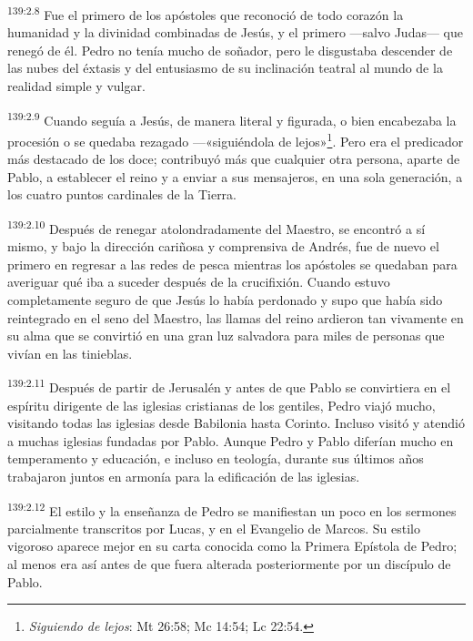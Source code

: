\par 
\textsuperscript{139:2.8} Fue el primero de los apóstoles que reconoció de todo corazón la humanidad y la divinidad combinadas de Jesús, y el primero ---salvo Judas--- que renegó de él. Pedro no tenía mucho de soñador, pero le disgustaba descender de las nubes del éxtasis y del entusiasmo de su inclinación teatral al mundo de la realidad simple y vulgar.

\par 
\textsuperscript{139:2.9} Cuando seguía a Jesús, de manera literal y figurada, o bien encabezaba la procesión o se quedaba rezagado ---«siguiéndola de lejos»\footnote{\textit{Siguiendo de lejos}: Mt 26:58; Mc 14:54; Lc 22:54.}. Pero era el predicador más destacado de los doce; contribuyó más que cualquier otra persona, aparte de Pablo, a establecer el reino y a enviar a sus mensajeros, en una sola generación, a los cuatro puntos cardinales de la Tierra.

\par 
\textsuperscript{139:2.10} Después de renegar atolondradamente del Maestro, se encontró a sí mismo, y bajo la dirección cariñosa y comprensiva de Andrés, fue de nuevo el primero en regresar a las redes de pesca mientras los apóstoles se quedaban para averiguar qué iba a suceder después de la crucifixión. Cuando estuvo completamente seguro de que Jesús lo había perdonado y supo que había sido reintegrado en el seno del Maestro, las llamas del reino ardieron tan vivamente en su alma que se convirtió en una gran luz salvadora para miles de personas que vivían en las tinieblas.

\par 
\textsuperscript{139:2.11} Después de partir de Jerusalén y antes de que Pablo se convirtiera en el espíritu dirigente de las iglesias cristianas de los gentiles, Pedro viajó mucho, visitando todas las iglesias desde Babilonia hasta Corinto. Incluso visitó y atendió a muchas iglesias fundadas por Pablo. Aunque Pedro y Pablo diferían mucho en temperamento y educación, e incluso en teología, durante sus últimos años trabajaron juntos en armonía para la edificación de las iglesias.

\par 
\textsuperscript{139:2.12} El estilo y la enseñanza de Pedro se manifiestan un poco en los sermones parcialmente transcritos por Lucas, y en el Evangelio de Marcos. Su estilo vigoroso aparece mejor en su carta conocida como la Primera Epístola de Pedro; al menos era así antes de que fuera alterada posteriormente por un discípulo de Pablo.


